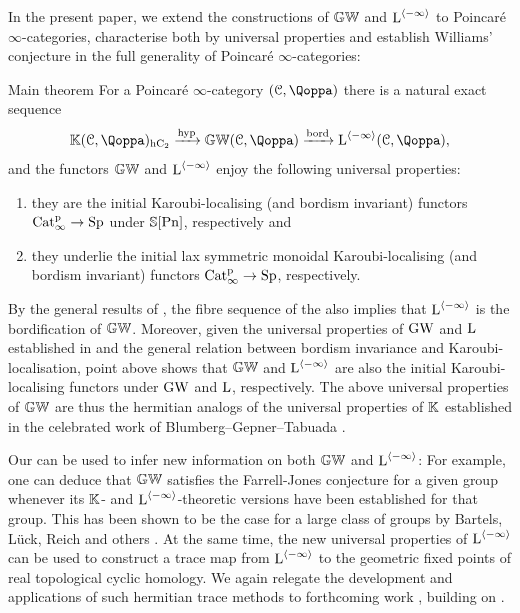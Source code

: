 In the present paper, we extend the constructions of $\mathbb{GW}$ and $\operatorname L^{\langle -\infty \rangle}$ to Poincaré $\infty$-categories, characterise both by universal properties and establish Williams' conjecture in the full generality of Poincar\'e $\infty$-categories:

\begin{named}{Main theorem}
\label{theorem:pfourmaintheorem}%
For a Poincaré $\infty$-category $(\C,\QF)$ there is a natural exact sequence
\[
\KK(\C,\QF)_\hC \xrightarrow{\hyp} \KGW(\C,\QF) \xrightarrow{\bord} \L^{\cotower{-\infty}}(\C,\QF),
\]
and the functors $\mathbb{GW}$ and $\operatorname L^{\langle -\infty \rangle}$ enjoy the following universal properties:
\begin{enumerate}
\item
\label{item:main-theorem-i}%
they are the initial Karoubi-localising (and bordism invariant) functors $\mathrm{Cat}^{\mathrm p}_\infty\to \mathrm{Sp}$ under $\mathbb{S}[\mathrm{Pn}]$,
respectively and
\item
\label{item:main-theorem-ii}%
they underlie the initial lax symmetric monoidal Karoubi-localising (and bordism invariant) functors $\mathrm{Cat}^{\mathrm p}_\infty\to \mathrm{Sp}$, respectively.
\end{enumerate}
\end{named}


By the general results of \papertwo, 
the fibre sequence of the  also implies that $\operatorname L^{\langle-\infty\rangle}$ is the bordification of $\mathbb{GW}$.
Moreover, given the universal properties of $\operatorname{GW}$ and $\operatorname L$ established in \papertwo and the general relation between bordism invariance and Karoubi-localisation, point  above shows that $\mathbb{GW}$ and $\operatorname L^{\langle -\infty \rangle}$ are also the initial Karoubi-localising functors under $\operatorname{GW}$ and $\operatorname L$, respectively. The above universal properties of $\mathbb{GW}$ are thus the hermitian analogs of the universal properties of $\mathbb K$ established in the celebrated work of Blumberg--Gepner--Tabuada \cite{BGT}. 


Our  can be used to infer new information on both $\mathbb{GW}$ and $\operatorname L^{\langle -\infty \rangle}$:
For example, one can deduce that $\mathbb{GW}$ satisfies the Farrell-Jones conjecture for a given group whenever its $\mathbb K$- and $\operatorname L^{\langle -\infty \rangle}$-theoretic versions have been established for that group. This has been shown to be the case for a large class of groups by Bartels, Lück, Reich and others \cite{Lueck-FJbook}. 
At the same time, the new universal properties of $\operatorname L^{\langle -\infty \rangle}$ can be used to construct a trace map from $\operatorname L^{\langle -\infty \rangle}$ to the geometric fixed points of real topological cyclic homology. We again relegate the development and applications of such hermitian trace methods to forthcoming work \cite{Harpaz-Nikolaus-Shah}, building on \cites{HNS-algtrace, HNRS-algtrace}. 

